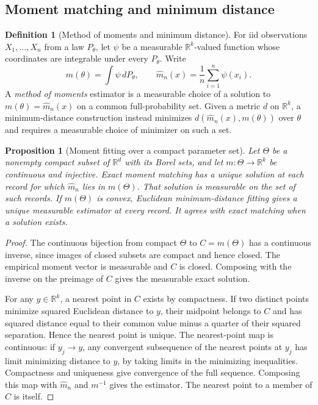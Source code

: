 \documentclass[11pt,oneside]{book}
\newtheorem{proposition}[theorem]{Proposition}
\theoremstyle{definition}
\newtheorem{definition}[theorem]{Definition}
\theoremstyle{remark}
\newcommand{\R}{\mathbb R}
\begin{document}
\subsection{Moment matching and minimum distance}
\label{subsec:moment-matching-minimum-distance}

\begin{definition}[Method of moments and minimum distance]
\label{def:moment-matching}
For iid observations $X_1,\ldots,X_n$ from a law $P_\theta$, let
$\psi$ be a measurable $\R^k$-valued function whose coordinates
are integrable under every $P_\theta$. Write
\[
m(\theta)=\int\psi\,dP_\theta,\qquad
\widehat m_n(x)=\frac1n\sum_{i=1}^n\psi(x_i).
\]
A \emph{method of moments} estimator is a measurable choice of
a solution to $m(\theta)=\widehat m_n(x)$ on a common full-probability
set. Given a metric $d$ on $\R^k$, a minimum-distance construction
instead minimizes $d(\widehat m_n(x),m(\theta))$ over $\theta$ and
requires a measurable choice of minimizer on such a set.
\end{definition}

\begin{proposition}[Moment fitting over a compact parameter set]
\label{prop:moment-fitting-compact}
Let $\Theta$ be a nonempty compact subset of $\R^d$ with its Borel sets,
and let $m:\Theta\to\R^k$ be continuous and injective. Exact moment
matching has a unique solution at each record for which
$\widehat m_n$ lies in $m(\Theta)$. That solution is measurable
on the set of such records. If $m(\Theta)$ is convex, Euclidean
minimum-distance fitting gives a unique measurable estimator
at every record. It agrees with exact matching when a solution exists.
\end{proposition}
\begin{proof}
The continuous bijection from compact $\Theta$ to $C=m(\Theta)$
has a continuous inverse, since images of closed subsets are compact
and hence closed. The empirical moment vector is measurable and
$C$ is closed. Composing with the inverse on the preimage of $C$
gives the measurable exact solution.

For any $y\in\R^k$, a nearest point in $C$ exists by compactness.
If two distinct points minimize squared Euclidean distance to $y$,
their midpoint belongs to $C$ and has squared distance equal to
their common value minus a quarter of their squared separation.
Hence the nearest point is unique. The nearest-point map is
continuous: if $y_j\to y$, any convergent subsequence of the nearest
points at $y_j$ has limit minimizing distance to $y$, by taking
limits in the minimizing inequalities. Compactness and uniqueness
give convergence of the full sequence. Composing this map with
$\widehat m_n$ and $m^{-1}$ gives the estimator. The nearest
point to a member of $C$ is itself.
\end{proof}
\end{document}
